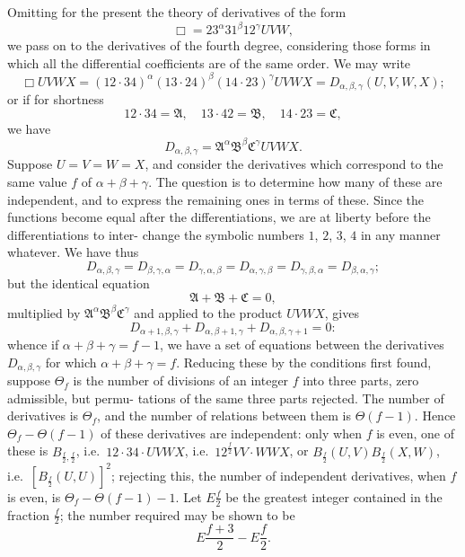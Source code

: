 \documentclass[11pt,a4paper]{article}
\theoremstyle{plain}
\theoremstyle{definition}
\theoremstyle{remark}
\begin{document}
Omitting for the present the theory of derivatives of the form
\[
\Box = 23^{\alpha} 31^{\beta} 12^{\gamma} UVW,
\]
we pass on to the derivatives of the fourth degree, considering those forms in which
all the differential coefficients are of the same order. We may write
\[
\Box UVWX = (12 \cdot 34)^{\alpha} (13 \cdot 24)^{\beta} (14 \cdot 23)^{\gamma} UVWX
= D_{\alpha, \beta, \gamma}(U, V, W, X);
\]
or if for shortness
\[
12 \cdot 34 = \mathfrak{A}, \quad 13 \cdot 42 = \mathfrak{B}, \quad 14 \cdot 23 = \mathfrak{C},
\]
we have
\[
D_{\alpha, \beta, \gamma} = \mathfrak{A}^{\alpha} \mathfrak{B}^{\beta} \mathfrak{C}^{\gamma} UVWX.
\]
Suppose $U = V = W = X$, and consider the derivatives which correspond to the same
value $f$ of $\alpha + \beta + \gamma$. The question is to determine how many of these are independent,
and to express the remaining ones in terms of these. Since the functions become
equal after the differentiations, we are at liberty before the differentiations to inter-
change the symbolic numbers $1$, $2$, $3$, $4$ in any manner whatever. We have thus
\[
D_{\alpha, \beta, \gamma} = D_{\beta, \gamma, \alpha} = D_{\gamma, \alpha, \beta} = D_{\alpha, \gamma, \beta} = D_{\gamma, \beta, \alpha} = D_{\beta, \alpha, \gamma};
\]
but the identical equation
\[
\mathfrak{A} + \mathfrak{B} + \mathfrak{C} = 0,
\]
multiplied by $\mathfrak{A}^{\alpha} \mathfrak{B}^{\beta} \mathfrak{C}^{\gamma}$ and applied to the product $UVWX$, gives
\[
D_{\alpha + 1, \beta, \gamma} + D_{\alpha, \beta + 1, \gamma} + D_{\alpha, \beta, \gamma + 1} = 0:
\]
whence if $\alpha + \beta + \gamma = f - 1$, we have a set of equations between the derivatives $D_{\alpha, \beta, \gamma}$
for which $\alpha + \beta + \gamma = f$. Reducing these by the conditions first found, suppose $\Theta_f$ is
the number of divisions of an integer $f$ into three parts, zero admissible, but permu-
tations of the same three parts rejected. The number of derivatives is $\Theta_f$, and the
number of relations between them is $\Theta(f-1)$. Hence $\Theta_f - \Theta(f-1)$ of these derivatives
are independent: only when $f$ is even, one of these is $B_{\frac{f}{2}, \frac{f}{2}}$, i.e.\ $12 \cdot 34 \cdot UVWX$,
i.e.\ $12^{\frac{f}{2}} VV \cdot WWX$, or $B_{\frac{f}{2}}(U, V) B_{\frac{f}{2}}(X, W)$, i.e.\ $[B_{\frac{f}{2}}(U, U)]^2$; rejecting this, the
number of independent derivatives, when $f$ is even, is $\Theta_f - \Theta(f-1) - 1$. Let $E\frac{f}{2}$
be the greatest integer contained in the fraction $\frac{f}{2}$; the number required may be
shown to be
\[
E\frac{f + 3}{2} - E\frac{f}{2}.
\]

\newpage
\setcounter{section}{14}
\end{document}
